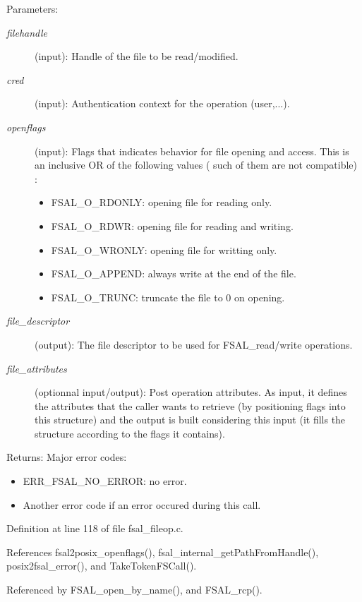\begin{Desc}
\item[Parameters:]
\begin{description}
\item[{\em filehandle}](input): Handle of the file to be read/modified. \item[{\em cred}](input): Authentication context for the operation (user,...). \item[{\em openflags}](input): Flags that indicates behavior for file opening and access. This is an inclusive OR of the following values ( such of them are not compatible) :\begin{itemize}
\item FSAL\_\-O\_\-RDONLY: opening file for reading only.\item FSAL\_\-O\_\-RDWR: opening file for reading and writing.\item FSAL\_\-O\_\-WRONLY: opening file for writting only.\item FSAL\_\-O\_\-APPEND: always write at the end of the file.\item FSAL\_\-O\_\-TRUNC: truncate the file to 0 on opening. \end{itemize}
\item[{\em file\_\-descriptor}](output): The file descriptor to be used for FSAL\_\-read/write operations. \item[{\em file\_\-attributes}](optionnal input/output): Post operation attributes. As input, it defines the attributes that the caller wants to retrieve (by positioning flags into this structure) and the output is built considering this input (it fills the structure according to the flags it contains).\end{description}
\end{Desc}
\begin{Desc}
\item[Returns:]Major error codes:\begin{itemize}
\item ERR\_\-FSAL\_\-NO\_\-ERROR: no error.\item Another error code if an error occured during this call. \end{itemize}
\end{Desc}


Definition at line 118 of file fsal\_\-fileop.c.

References fsal2posix\_\-openflags(), fsal\_\-internal\_\-getPathFromHandle(), posix2fsal\_\-error(), and TakeTokenFSCall().

Referenced by FSAL\_\-open\_\-by\_\-name(), and FSAL\_\-rcp().
